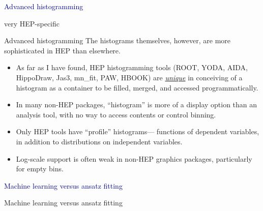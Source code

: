 \documentclass[aspectratio=169]{beamer}
\begin{document}

\begin{frame}{}
\huge
\vspace{0.5 cm}
\begin{center}
\textcolor{darkblue}{Advanced histogramming}

\large
\vspace{0.5 cm}
very HEP-specific
\end{center}
\end{frame}

\begin{frame}{Advanced histogramming}
\large
\vspace{0.5 cm}
{\Large The histograms themselves, however, are more sophisticated in HEP than elsewhere.}
\vspace{0.25 cm}
\begin{itemize}\setlength{\itemsep}{0.25 cm}
\item<2-> As far as I have found, HEP histogramming tools (ROOT, YODA, AIDA, HippoDraw, Jas3, mn\_fit, PAW, HBOOK) are \underline{\it unique} in conceiving of a histogram as a container to be filled, merged, and accessed programmatically.
\item<3-> In many non-HEP packages, ``histogram'' is more of a display option than an analysis tool, with no way to access contents or control binning.
\item<4-> Only HEP tools have ``profile'' histograms--- functions of dependent variables, in addition to distributions on independent variables.
\item<5-> Log-scale support is often weak in non-HEP graphics packages, particularly for empty bins.
\end{itemize}
\begin{center}
\end{center}
\end{frame}

\begin{frame}{}
\huge
\vspace{0.5 cm}
\begin{center}
\textcolor{darkblue}{Machine learning versus ansatz fitting}
\end{center}
\end{frame}

\begin{frame}{Machine learning versus ansatz fitting}
\end{frame}
\end{document}
